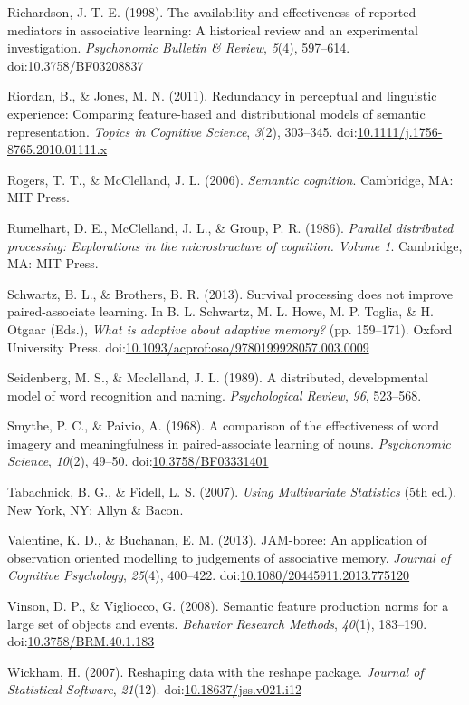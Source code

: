 \documentclass[english,man]{apa6}
\theoremstyle{definition}
\theoremstyle{definition}
\theoremstyle{definition}
\theoremstyle{remark}
\begin{document}
\hypertarget{ref-Richardson1998}{}
Richardson, J. T. E. (1998). The availability and effectiveness of
reported mediators in associative learning: A historical review and an
experimental investigation. \emph{Psychonomic Bulletin \& Review},
\emph{5}(4), 597--614.
doi:\href{https://doi.org/10.3758/BF03208837}{10.3758/BF03208837}

\hypertarget{ref-Riordan2011}{}
Riordan, B., \& Jones, M. N. (2011). Redundancy in perceptual and
linguistic experience: Comparing feature-based and distributional models
of semantic representation. \emph{Topics in Cognitive Science},
\emph{3}(2), 303--345.
doi:\href{https://doi.org/10.1111/j.1756-8765.2010.01111.x}{10.1111/j.1756-8765.2010.01111.x}

\hypertarget{ref-Rogers2006}{}
Rogers, T. T., \& McClelland, J. L. (2006). \emph{Semantic cognition}.
Cambridge, MA: MIT Press.

\hypertarget{ref-Rumelhart1986}{}
Rumelhart, D. E., McClelland, J. L., \& Group, P. R. (1986).
\emph{Parallel distributed processing: Explorations in the
microstructure of cognition. Volume 1}. Cambridge, MA: MIT Press.

\hypertarget{ref-Schwartz2013}{}
Schwartz, B. L., \& Brothers, B. R. (2013). Survival processing does not
improve paired-associate learning. In B. L. Schwartz, M. L. Howe, M. P.
Toglia, \& H. Otgaar (Eds.), \emph{What is adaptive about adaptive
memory?} (pp. 159--171). Oxford University Press.
doi:\href{https://doi.org/10.1093/acprof:oso/9780199928057.003.0009}{10.1093/acprof:oso/9780199928057.003.0009}

\hypertarget{ref-Seidenberg1989}{}
Seidenberg, M. S., \& Mcclelland, J. L. (1989). A distributed,
developmental model of word recognition and naming. \emph{Psychological
Review}, \emph{96}, 523--568.

\hypertarget{ref-Smythe1968}{}
Smythe, P. C., \& Paivio, A. (1968). A comparison of the effectiveness
of word imagery and meaningfulness in paired-associate learning of
nouns. \emph{Psychonomic Science}, \emph{10}(2), 49--50.
doi:\href{https://doi.org/10.3758/BF03331401}{10.3758/BF03331401}

\hypertarget{ref-Tabachnick2007}{}
Tabachnick, B. G., \& Fidell, L. S. (2007). \emph{Using Multivariate
Statistics} (5th ed.). New York, NY: Allyn \& Bacon.

\hypertarget{ref-Valentine2013}{}
Valentine, K. D., \& Buchanan, E. M. (2013). JAM-boree: An application
of observation oriented modelling to judgements of associative memory.
\emph{Journal of Cognitive Psychology}, \emph{25}(4), 400--422.
doi:\href{https://doi.org/10.1080/20445911.2013.775120}{10.1080/20445911.2013.775120}

\hypertarget{ref-Vinson2008}{}
Vinson, D. P., \& Vigliocco, G. (2008). Semantic feature production
norms for a large set of objects and events. \emph{Behavior Research
Methods}, \emph{40}(1), 183--190.
doi:\href{https://doi.org/10.3758/BRM.40.1.183}{10.3758/BRM.40.1.183}

\hypertarget{ref-Wickham2007}{}
Wickham, H. (2007). Reshaping data with the reshape package.
\emph{Journal of Statistical Software}, \emph{21}(12).
doi:\href{https://doi.org/10.18637/jss.v021.i12}{10.18637/jss.v021.i12}
\end{document}
